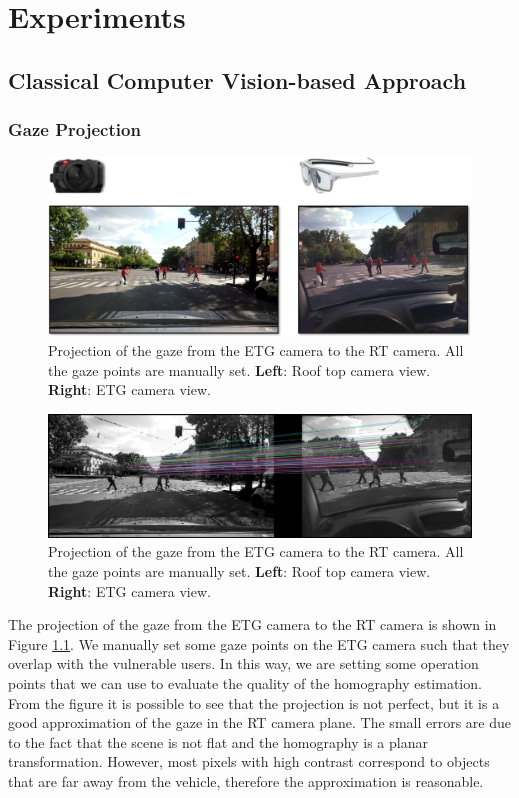 \chapter{Experiments}

\section{Classical Computer Vision-based Approach}

\subsection{Gaze Projection}
\begin{figure}
    \centering
    \includegraphics[width=\textwidth]{images/dreyeve/gaze_projection.png}
    \caption{Projection of the gaze from the ETG camera to the RT camera. 
    All the gaze points are manually set.
    \textbf{Left}: Roof top camera view.
    \textbf{Right}: ETG camera view.}
    \label{fig:gaze_projection}
\end{figure}
\begin{figure}
    \centering
    \includegraphics[width=\textwidth]{images/dreyeve/gaze_matchings.png}
    \caption{Projection of the gaze from the ETG camera to the RT camera. 
    All the gaze points are manually set.
    \textbf{Left}: Roof top camera view.
    \textbf{Right}: ETG camera view.}
    \label{fig:gaze_matchings}
\end{figure}
The projection of the gaze from the ETG camera to the RT camera is shown in 
Figure \ref{fig:gaze_projection}. We manually set some gaze points on the 
ETG camera such that they overlap with the vulnerable users. In this way, 
we are setting some operation points that we can use to evaluate the quality 
of the homography estimation. From the figure it is possible to see that the 
projection is not perfect, but it is a good approximation of the gaze in the 
RT camera plane. The small errors are due to the fact that the scene is not 
flat and the homography is a planar transformation. However, most pixels with 
high contrast correspond to objects that are far away from the vehicle, 
therefore the approximation is reasonable.

